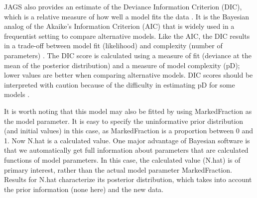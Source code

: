 \documentclass[
]{krantz}
\begin{document}
JAGS also provides an estimate of the Deviance Information Criterion (DIC), which is a relative measure of how well a model fits the data \citep{mccarthy2007, lunn.etal2009}. It is the Bayesian analog of the Akaike's Information Criterion (AIC) that is widely used in a frequentist setting to compare alternative models. Like the AIC, the DIC results in a trade-off between model fit (likelihood) and complexity (number of parameters) \citep{mccarthy2007}. The DIC score is calculated using a measure of fit (deviance at the mean of the posterior distribution) and a measure of model complexity (pD); lower values are better when comparing alternative models. DIC scores should be interpreted with caution because of the difficulty in estimating pD for some models \citep{lunn.etal2009}.

It is worth noting that this model may also be fitted by using MarkedFraction as the model parameter. It is easy to specify the uninformative prior distribution (and initial values) in this case, as MarkedFraction is a proportion between 0 and 1. Now N.hat is a calculated value. One major advantage of Bayesian software is that we automatically get full information about parameters that are calculated functions of model parameters. In this case, the calculated value (N.hat) is of primary interest, rather than the actual model parameter MarkedFraction. Results for N.hat characterize its posterior distribution, which takes into account the prior information (none here) and the new data.
\end{document}
